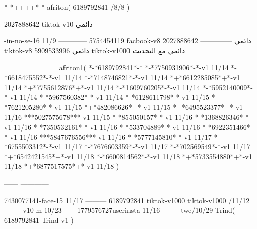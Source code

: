 *-*++++*-*
afriton(
6189792841 /8/8
)

2027888642 tiktok-v10
دائمي

-in-no-se-16 11/9
------------
5754454119 facbook-v8
دائمي
--------------
2027888642 tiktok-v8
دائمي
5909533996 tiktok-v1000
دائمي مع التحديث

__________
afriton1(
*-*6189792841*-*
*-*7750931906*-*-v1 11/14
*-*6618475552*-*-v1 11/14
*-*7148746821*-*-v1 11/14
*+*6612285085*+*-v1 11/14
*+*7755612876*+*-v1 11/14
*-*1609760205*-*-v1 11/14
*-*5952140009*-*-v1 11/14
*-*5967560382*-*-v1 11/14
*-*6128611798*-*-v1 11/15
*-*7621205280*-*-v1 11/15
*+*482086626*+*-v1 11/15
*+*6495523377*+*-v1 11/16
***5027575678***-v1 11/15
*-*855050157*-*-v1 11/16
*-*1368826346*-*-v1 11/16
*-*7350532161*-*-v1 11/16
*-*533704889*-*-v1 11/16
*-*6922351466*-*-v1 11/16
***5847676556***-v1 11/16
*-*5777145810*-*-v1 11/17
*-*6755503312*-*-v1 11/17
*-*7676603359*-*-v1 11/17
*-*702569549*-*-v1 11/17
*+*6542421545*+*-v1 11/18
*-*6600814562*-*-v1 11/18
*+*5733554880*+*-v1 11/18
*+*6877517575*+*-v1 11/18
)

------
------------

7430077141-face-15 11/17
---------
6189792841 tiktok-v1000
tiktok-v1000 /11/12
------
-v10-m 10/23
-----
1779576727userinsta 11/16
------
-twe/10/29
Trind(
6189792841-Trind-v1 
)
